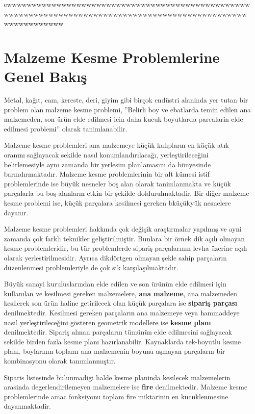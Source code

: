 \documentclass[]{book}
\begin{document}
ewwwwwwwwwwwwwwwwwwwwwwwwwwwwwwwwwwwwwwwwwwwwwwwwwwwwwwwwwwwwwwwwwwwwwwwwwwwwwwwwwwwwwwwwwwwwwwwwwwwwwwwwwwwwww

\hypertarget{malzeme-kesme-problemlerine-genel-bakis}{%
\section{Malzeme Kesme Problemlerine Genel Bakış}\label{malzeme-kesme-problemlerine-genel-bakis}}

Metal, kağıt, cam, kereste, deri, giyim gibi birçok endüstri alaninda yer tutan bir problem olan malzeme kesme problemi, ''Belirli boy ve ebatlarda temin edilen ana malzemeden, son ürün elde edilmesi icin daha kucuk boyutlarda parcalarin elde edilmesi problemi'' olarak tanimlanabilir.

Malzeme kesme problemleri ana malzemeye küçük kalıpların en küçük atık oranını sağlayacak sekilde nasıl konumlandırılacağı, yerleştirileceğini belirlemesiyle aynı zamanda bir yerlesim planlamasını da bünyesinde barındırmaktadır. Malzeme kesme problemlerinin bir alt kümesi istif problemlerinde ise büyük nesneler boş alan olarak tanimlanmakta ve küçük parçalarla bu boş alanların etkin bir şekilde doldurulmaktadir. Bir diğer malzeme kesme problemi ise, küçük parçalara kesilmesi gereken bküçükyük nesnelere dayanır.

Malzeme kesme problemleri hakkında çok değişik araştırmalar yapılmış ve ayni zamanda çok farklı teknikler geliştirilmiştir. Bunlara bir örnek dik açılı olmayan kesme problemleridir, bu tür problemlerde sipariş parçalarının levha üzerine açılı olarak yerlestirilmesidir. Ayrıca dikdörtgen olmayan şekle sahip parçaların düzenlenmesi problemleriyle de çok sık karşılaşılmaktadır.

Büyük sanayi kuruluslarından elde edilen ve son ürünün elde edilmesi için kullanılan ve kesilmesi gereken malzemelere, \textbf{ana malzeme}, ana malzemeden kesilerek son ürün haline getirilecek olan küçük parçalara ise \textbf{sipariş parçası} denilmektedir. Kesilmesi gereken parçaların ana malzemeye veya hammaddeye nasıl yerleştirileceğini gösteren geometrik modellere ise \textbf{kesme planı} denilmektedir. Sipariş alınan parçaların tümünün elde edilmesini sağlayacak sekilde birden fazla kesme planı hazırlanabilir. Kaynaklarda tek-boyutlu kesme planı, boylarının toplamı ana malzemenin boyunu aşmayan parçaların bir kombinasyonu olarak tanımlanmıştır.

Siparis listesinde bulunmadigi halde kesme planinda kesilecek malzemelerin arasinda degerlendirilemeyen malzemelere ise \textbf{fire} denilmektedir. Malzeme kesme problemlerinde amac fonksiyonu toplam fire miktarinin en kucuklenmesine dayanmaktadir.
\end{document}
